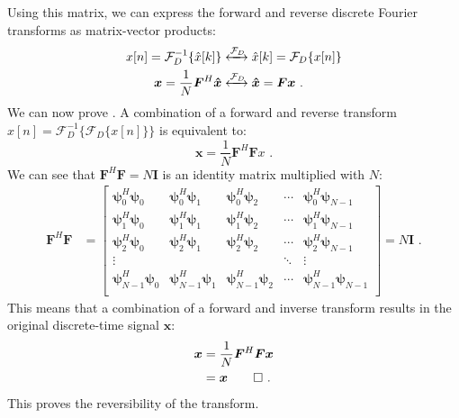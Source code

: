 Using this matrix, we can express the forward and reverse discrete Fourier transforms as matrix-vector products:
\begin{align}
  x[n] = \mathcal{F}_D^{-1}\{\hat{x}[k]\} & \xleftrightarrow{\mathcal{F}_D} \hat{x}[k] = \mathcal{F}_D\{x[n]\} \\
  \bm{x}=\frac{1}{N}\bm{F}^H\bm{\hat{x}}  & \xleftrightarrow{\mathcal{F}_D} \bm{\hat{x}}=\bm{F} \bm{x} \,\,.
\end{align}
We can now prove . A combination of a forward and 
reverse transform $x[n]=\mathcal{F}_D^{-1}\{\mathcal{F}_D\{x[n]\}\}$ is equivalent to:
\begin{equation}
  \bm{x} = \frac{1}{N}\bm{F}^H \bm{F} x \,\,.
\end{equation}
We can see that $\bm{F}^H \bm{F} = N\bm{I}$ is an identity matrix
multiplied with $N$:
\begin{align}
  \bm{F}^H \bm{F} & = \begin{bmatrix}
                        \bm{\psi}_0^H \bm{\psi}_0     & \bm{\psi}_0^H \bm{\psi}_1     & \bm{\psi}_0^H \bm{\psi}_2     & \cdots & \bm{\psi}_0^H \bm{\psi}_{N-1}     \\
                        \bm{\psi}_1^H \bm{\psi}_0     & \bm{\psi}_1^H \bm{\psi}_1     & \bm{\psi}_1^H \bm{\psi}_2     & \cdots & \bm{\psi}_1^H \bm{\psi}_{N-1}     \\
                        \bm{\psi}_2^H \bm{\psi}_0     & \bm{\psi}_2^H \bm{\psi}_1     & \bm{\psi}_2^H \bm{\psi}_2     & \cdots & \bm{\psi}_2^H \bm{\psi}_{N-1}     \\
                        \vdots                        &                               &                               & \ddots & \vdots                            \\
                        \bm{\psi}_{N-1}^H \bm{\psi}_0 & \bm{\psi}_{N-1}^H \bm{\psi}_1 & \bm{\psi}_{N-1}^H \bm{\psi}_2 & \cdots & \bm{\psi}_{N-1}^H \bm{\psi}_{N-1} \\
                      \end{bmatrix}=N\bm{I} \,\,.
\end{align}
This means that a combination of a forward and inverse transform results in the original 
discrete-time signal $\bm{x}$:
\begin{align}
  \bm{x} & = \frac{1}{N}\bm{F}^H \bm{F} \bm{x} \\
         & = \bm{x} \qed \,\,.
\end{align}
This proves the reversibility of the transform.

